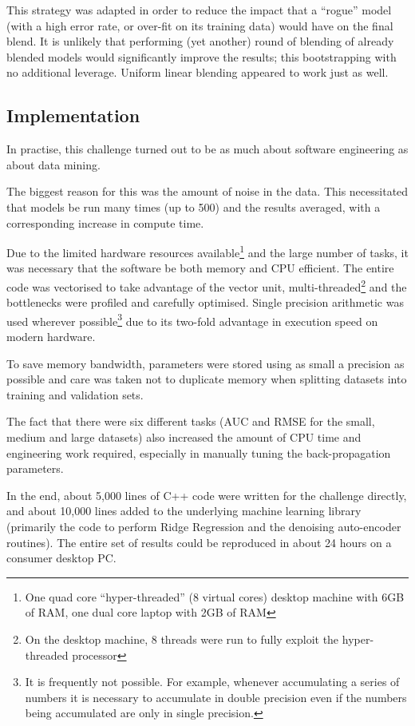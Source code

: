 \documentclass{article}
\begin{document}
This strategy was adapted in order to reduce the impact that a ``rogue'' model (with a high error rate, or over-fit on its training data) would have on the final blend.  It is unlikely that performing (yet another) round of blending of already blended models would significantly improve the results; this bootstrapping with no additional leverage.  Uniform linear blending appeared to work just as well.

\subsection{Implementation}

In practise, this challenge turned out to be as much about software engineering as about data mining.

The biggest reason for this was the amount of noise in the data.  This necessitated that models be run many times (up to 500) and the results averaged, with a corresponding increase in compute time.

Due to the limited hardware resources available\footnote{One quad core ``hyper-threaded'' (8 virtual cores) desktop machine with 6GB of RAM, one dual core laptop with 2GB of RAM} and the large number of tasks, it was necessary that the software be both memory and CPU efficient.
The entire code was vectorised to take advantage of the vector unit, multi-threaded\footnote{On the desktop machine, 8 threads were run to fully exploit the hyper-threaded processor} and the bottlenecks were profiled and carefully optimised.  Single precision arithmetic was used wherever possible\footnote{It is frequently not possible.  For example, whenever accumulating a series of numbers it is necessary to accumulate in double precision even if the numbers being accumulated are only in single precision.} due to its two-fold advantage in execution speed on modern hardware.

To save memory bandwidth, parameters were stored using as small a precision as possible and care was taken not to duplicate memory when splitting datasets into training and validation sets.

The fact that there were six different tasks (AUC and RMSE for the small, medium and large datasets) also increased the amount of CPU time and engineering work required, especially in manually tuning the back-propagation parameters.

In the end, about 5,000 lines of C++ code were written for the challenge directly, and about 10,000 lines added to the underlying machine learning library (primarily the code to perform Ridge Regression and the denoising auto-encoder routines).  The entire set of results could be reproduced in about 24 hours on a consumer desktop PC.
\end{document}
